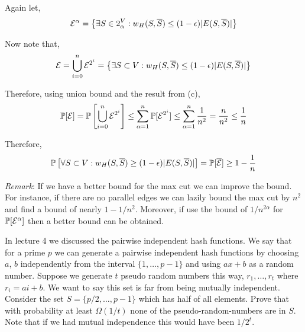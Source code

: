 \documentclass[10pt]{article}
\begin{document}
\begin{solution}[Solution]
\begin{enumerate}[label=(\alph*)]
        Again let,
        \begin{align*}
            \mathcal{E}^{\alpha} = \left\{ \exists S\in 2^V_{\alpha} : w_H(S,\overline{S}) \leq (1-\epsilon) |E(S,\overline{S})|  \right\}
        \end{align*}
        
        Now note that, 
        \begin{align*}
            \mathcal{E} = \bigcup_{i = 0}^{n} \mathcal{E}^{2^i} 
            =\left\{ \exists S\subset V : w_H(S,\overline{S}) \leq (1-\epsilon) |E(S,\overline{S})|  \right\}
        \end{align*}
 
        Therefore, using union bound and the result from (c), 
        \begin{align*}
            \mathbb{P}[\mathcal{E}] 
            = \mathbb{P} \left[\bigcup_{i = 0}^{n} \mathcal{E}^{2^i} \right]
            \leq \sum_{\alpha=1}^{n} \mathbb{P}[\mathcal{E}^{2^i}]
            \leq \sum_{\alpha=1}^{n} \frac{1}{n^2} 
            =  \frac{n}{n^2}
            \leq \frac{1}{n}
        \end{align*}
        
        Therefore,
        \begin{align*}
            \mathbb{P} \left[ \forall S\subset V: w_H(S,\overline{S}) \geq (1-\epsilon) |E(S,\overline{S})| \right] 
            = \mathbb{P}[\overline{\mathcal{E}}]
            \geq 1 - \frac{1}{n}
        \end{align*}

        \textit{Remark}: If we have a better bound for the max cut we can improve the bound. For instance, if there are no parallel edges we can lazily bound the max cut by \( n^2 \) and find a bound of nearly \( 1-1/n^2 \). Moreover, if use the bound of \( 1/n^{2 \alpha} \) for \( \mathbb{P}[\mathcal{E}^{\alpha}] \) then a better bound can be obtained. 


\end{enumerate}

\end{solution}


\begin{problem}[Problem 4]
    In lecture 4 we discussed the pairwise independent hash functions. We say that for a prime \( p \) we can 
    generate a pairwise independent hash functions by choosing \(a\), \(b\) independently from the interval \( \{1, \ldots, p-1 \} \) 
    and using \( ax + b \) as a random number. Suppose we generate \( t \) pseudo random numbers this way,
    \( r_1, \ldots , r_t \) where \( r_i = a i + b \). We want to say this set is far from being mutually independent. Consider
    the set \( S = \{p/2, \ldots , p - 1\} \) which has half of all elements. Prove that with probability at least \( \Omega(1/t) \)
    none of the pseudo-random-numbers are in \( S \). Note that if we had mutual independence this would have been \( 1/2^t \).
\end{problem}
\end{document}
